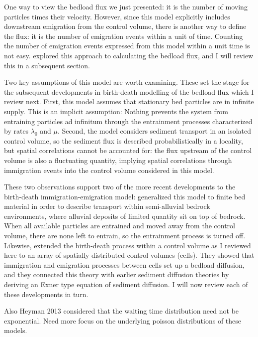 One way to view the bedload flux we just presented: it is the number of moving particles times their velocity. 
However, since this model explicitly includes downstream emigration from the control volume, there is another way to define the flux: it is the number of emigration events within a unit of time. 
Counting the number of emigration events expressed from this model within a unit time is not easy. 
\citet{Ma2014b} explored this approach to calculating the bedload flux, and I will review this in a subsequent section. 

Two key assumptions of this model are worth examining. 
These set the stage for the subsequent developments in birth-death modelling of the bedload flux which I review next. 
First, this model assumes that stationary bed particles are in infinite supply. 
This is an implicit assumption: Nothing prevents the system from entraining particles ad infinitum through the entrainment processes characterized by rates $\lambda_0$ and $\mu$. 
Second, the model considers sediment transport in an isolated control volume, so the sediment flux is described probabilistically in a locality, but spatial correlations cannot be accounted for: the flux upstream of the control volume is also a fluctuating quantity, implying spatial correlations through immigration events into the control volume considered in this model.

These two observations support two of the more recent developments to the \citet{Ancey2008} birth-death immigration-emigration model: \citet{Turowski2009} generalized this model to finite bed material in order to describe transport within semi-alluvial bedrock environments, where alluvial deposits of limited quantity sit on top of bedrock. When all available particles are entrained and moved away from the control volume, there are none left to entrain, so the entrainment process is turned off. 
Likewise, \citet{Ancey2010, Ancey2014,Ancey2015} extended the birth-death process within a control volume as I reviewed here to an array of spatially distributed control volumes (cells). 
They showed that immigration and emigration processes between cells set up a bedload diffusion, and they connected this theory with earlier sediment diffusion theories by deriving an Exner type equation of sediment diffusion. 
I will now review each of these developments in turn. 


Also Heyman 2013 considered that the waiting time distribution need not be exponential. Need more focus on the underlying poisson distributions of these models. 


